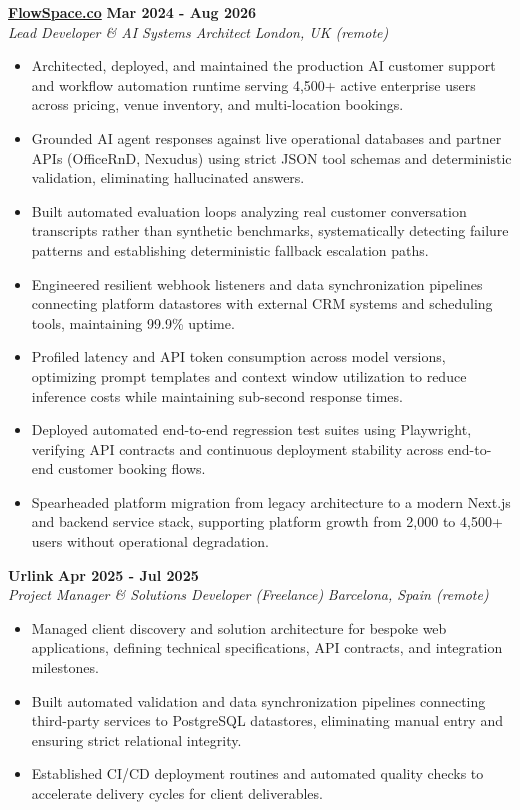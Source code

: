 \documentclass[10pt,a4paper]{article}
\newcommand{\role}[4]{%
  \textbf{#1} \hfill \textbf{#2}\\[1pt]%
  \textit{#3} \hfill \textit{#4}\\[2pt]%
}
\begin{document}
\role{\href{https://flowspace.co}{FlowSpace.co}}{Mar 2024 - Aug 2026}{Lead Developer \& AI Systems Architect}{London, UK (remote)}
\begin{itemize}
  \item Architected, deployed, and maintained the production AI customer support and workflow automation runtime serving 4,500+ active enterprise users across pricing, venue inventory, and multi-location bookings.
  \item Grounded AI agent responses against live operational databases and partner APIs (OfficeRnD, Nexudus) using strict JSON tool schemas and deterministic validation, eliminating hallucinated answers.
  \item Built automated evaluation loops analyzing real customer conversation transcripts rather than synthetic benchmarks, systematically detecting failure patterns and establishing deterministic fallback escalation paths.
  \item Engineered resilient webhook listeners and data synchronization pipelines connecting platform datastores with external CRM systems and scheduling tools, maintaining 99.9\% uptime.
  \item Profiled latency and API token consumption across model versions, optimizing prompt templates and context window utilization to reduce inference costs while maintaining sub-second response times.
  \item Deployed automated end-to-end regression test suites using Playwright, verifying API contracts and continuous deployment stability across end-to-end customer booking flows.
  \item Spearheaded platform migration from legacy architecture to a modern Next.js and backend service stack, supporting platform growth from 2,000 to 4,500+ users without operational degradation.
\end{itemize}

\role{Urlink}{Apr 2025 - Jul 2025}{Project Manager \& Solutions Developer (Freelance)}{Barcelona, Spain (remote)}
\begin{itemize}
  \item Managed client discovery and solution architecture for bespoke web applications, defining technical specifications, API contracts, and integration milestones.
  \item Built automated validation and data synchronization pipelines connecting third-party services to PostgreSQL datastores, eliminating manual entry and ensuring strict relational integrity.
  \item Established CI/CD deployment routines and automated quality checks to accelerate delivery cycles for client deliverables.
\end{itemize}
\end{document}
